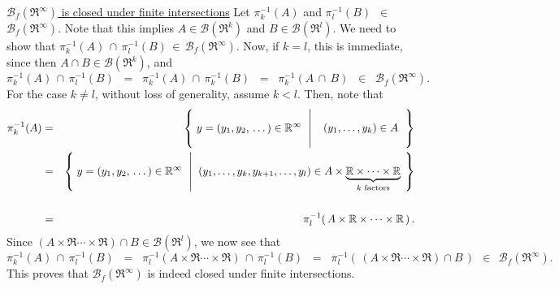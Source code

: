 \begin{enumerate}
	\vskip 0.1cm
	\noindent
	\underline{$\mathcal{B}_{f}\!\left(\Re^{\infty}\right)$ is closed under finite intersections}
	\vskip 0.0cm
	\noindent
	Let $\pi^{-1}_{k}(A)$ and $\pi^{-1}_{l}(B)$ \,$\in$\, $\mathcal{B}_{f}(\Re^{\infty})$.
	Note that this implies $A \in \mathcal{B}(\Re^{k})$ and $B \in \mathcal{B}(\Re^{l})$.
	We need to show that
	$\pi^{-1}_{k}(A) \,\cap\, \pi^{-1}_{l}(B) \,\in\, \mathcal{B}_{f}(\Re^{\infty})$.
	Now, if $k = l$, this is immediate, since then $A \cap B \in \mathcal{B}(\Re^{k})$, and
	\begin{equation*}
	\pi^{-1}_{k}(A) \,\cap\, \pi^{-1}_{l}(B)
	\;\; = \;\; \pi^{-1}_{k}(A) \,\cap\, \pi^{-1}_{k}(B)
	\;\; = \;\; \pi^{-1}_{k}(A\,\cap\,B)
	\;\; \in \;\; \mathcal{B}_{f}(\Re^{\infty}).
	\end{equation*}
	For the case $k \neq l$, without loss of generality, assume $k < l$.
	Then, note that
	\begin{eqnarray*}
	\pi_{k}^{-1}(A)
	&=& \left\{\;
		y=(y_{1},y_{2},\,\ldots\,)\in\Re^{\infty}
		\;\,\left\vert\;\;
		\begin{array}{c} \mbox{} \\ (y_{1},\ldots,y_{k})\in A \\ \mbox{} \end{array}
		\right.\right\}
	\\
	&=& \left\{\;
		y=(y_{1},y_{2},\,\ldots\,)\in\Re^{\infty}
		\;\,\left\vert\;\;
		(y_{1},\ldots,y_{k},y_{k+1},\ldots,y_{l})
		\in A\times \underset{\textnormal{$k$ factors}}{\underbrace{\Re\times\cdots\times\Re}}
		\right.\;\right\}
	\\ \\
	&=& \pi^{-1}_{l}\!\left(\,A\times\Re\times\cdots\times\Re\,\right).
	\end{eqnarray*}
	Since $(A \times \Re \cdots \times \Re) \cap B \in \mathcal{B}(\Re^{l})$,
	we now see that
	\begin{equation*}
	\pi^{-1}_{k}(A) \,\cap\, \pi^{-1}_{l}(B)
	\;\;=\;\; \pi^{-1}_{l}(A \times \Re \cdots \times \Re) \,\cap\, \pi^{-1}_{l}(B)
	\;\;=\;\; \pi^{-1}_{l}(\,(A \times \Re \cdots \times \Re) \cap B\,)
	\;\,\in\;\, \mathcal{B}_{f}(\Re^{\infty}).
	\end{equation*}
	This proves that $\mathcal{B}_{f}(\Re^{\infty})$ is indeed closed under finite intersections.


\end{enumerate}
